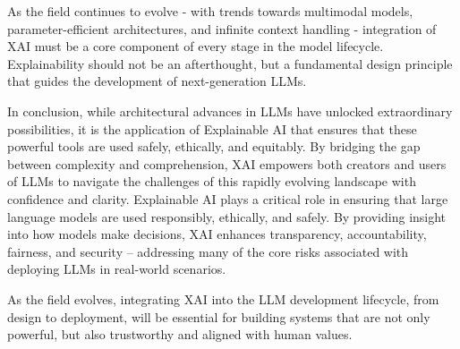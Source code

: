 \documentclass[conference]{IEEEtran}
\begin{document}
As the field continues to evolve - with trends towards multimodal models, parameter-efficient architectures, and infinite context handling - integration of XAI must be a core component of every stage in the model lifecycle. Explainability should not be an afterthought, but a fundamental design principle that guides the development of next-generation LLMs.

In conclusion, while architectural advances in LLMs have unlocked extraordinary possibilities, it is the application of Explainable AI that ensures that these powerful tools are used safely, ethically, and equitably. By bridging the gap between complexity and comprehension, XAI empowers both creators and users of LLMs to navigate the challenges of this rapidly evolving landscape with confidence and clarity.
Explainable AI plays a critical role in ensuring that large language models are used responsibly, ethically, and safely. By providing insight into how models make decisions, XAI enhances transparency, accountability, fairness, and security – addressing many of the core risks associated with deploying LLMs in real-world scenarios.

As the field evolves, integrating XAI into the LLM development lifecycle, from design to deployment, will be essential for building systems that are not only powerful, but also trustworthy and aligned with human values.
\end{document}
